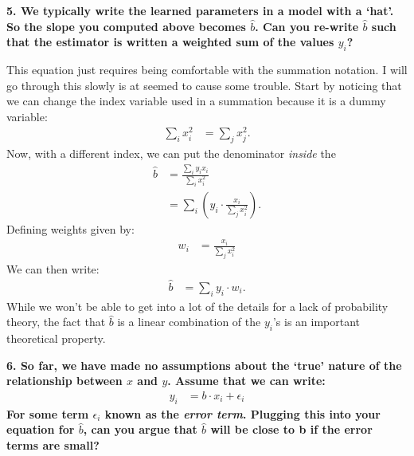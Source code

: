 \documentclass[12pt,hidelinks]{article}
\numberwithin{equation}{section}
\begin{document}
\vspace*{12pt}

\textbf{5. We typically write the learned parameters in a model with a `hat'. So
the slope you computed above becomes $\widehat{b}$. Can you re-write $\widehat{b}$
such that the estimator is written a weighted sum of the values $y_i$?}

\vspace*{12pt}

This equation just requires being comfortable with the summation notation.
I will go through this slowly is at seemed to cause some trouble. Start by
noticing that we can change the index variable used in a summation because
it is a dummy variable:
\begin{align*}
\sum_i x_i^2 &= \sum_j x_j^2.
\end{align*}
Now, with a different index, we can put the denominator \textit{inside} the
\begin{align*}
\widehat{b} &= \frac{\sum_i y_i x_i}{\sum_i x_i^2} \\
&= \sum_i \left( y_i \cdot \frac{x_i}{\sum_j x_i^2} \right).
\end{align*}
Defining weights given by:
\begin{align*}
w_i &= \frac{x_i}{\sum_j x_i^2}
\end{align*}
We can then write:
\begin{align*}
\widehat{b} &= \sum_i y_i \cdot w_i.
\end{align*}
While we won't be able to get into a lot of the details for a lack of probability
theory, the fact that $\widehat{b}$ is a linear combination of the $y_i$'s is
an important theoretical property.

\vspace*{12pt}

\textbf{6. So far, we have made no assumptions about the `true' nature of the
relationship between $x$ and $y$. Assume that we can write:}
\begin{align}
y_i &= b \cdot x_i + \epsilon_i
\end{align}
\textbf{For some term $\epsilon_i$ known as the \textit{error term}. Plugging
this into your equation for $\widehat{b}$, can you argue that $\widehat{b}$
will be close to b if the error terms are small?}

\vspace*{12pt}
\end{document}
